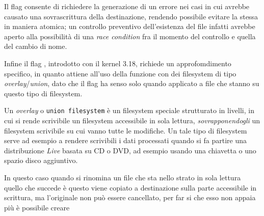 Il flag  consente di richiedere la generazione di un
errore nei casi in cui  avrebbe causato una sovrascrittura della
destinazione, rendendo possibile evitare la stessa in maniera atomica; un
controllo preventivo dell'esistenza del file infatti avrebbe aperto alla
possibilità di una \textit{race condition} fra il momento del controllo e
quella del cambio di nome.


Infine il flag , introdotto con il kernel 3.18,
richiede un approfomdimento specifico, in quanto attiene all'uso della
funzione con dei filesystem di tipo \textit{overlay}/\textit{union}, dato che
il flag ha senso solo quando applicato a file che stanno su questo tipo di
filesystem. 

Un \textit{overlay} o \texttt{union filesystem} è un filesystem speciale
strutturato in livelli, in cui si rende scrivibile un filesystem accessibile
in sola lettura, \textsl{sovrapponendogli} un filesystem scrivibile su cui
vanno tutte le modifiche. Un tale tipo di filesystem serve ad esempio a
rendere scrivibili i dati processati quando si fa partire una distribuzione
\textit{Live} basata su CD o DVD, ad esempio usando una chiavetta o uno spazio
disco aggiuntivo.

In questo caso quando si rinomina un file che sta nello strato in sola lettura
quello che succede è questo viene copiato a destinazione sulla parte
accessibile in scrittura, ma l'originale non può essere cancellato, per far si
che esso non appaia più è possibile creare 








